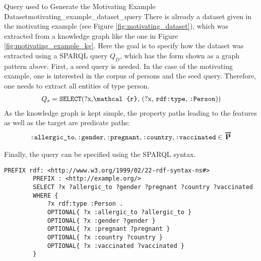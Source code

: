     \begin{Bsp}{Query used to Generate the Motivating Example Dataset}{motivating_example_dataset_query}
    There is already a dataset given in the motivating example (see Figure \ref{fig:motivating_dataset}), which was extracted from a knowledge graph like the one in Figure \ref{fig:motivating_example_kg}. Here the goal is to specify how the dataset was extracted using a SPARQL query $Q_D$, which has the form shown as a graph pattern above.
    First, a seed query is needed. In the case of the motivating example, one is interested in the corpus of persons and the seed query. Therefore, one needs to extract all entities of type person.
    \begin{gather*}
        Q_s = \text{\uri{SELECT}(?x,$\mathcal{r}$, (?x, \uri{rdf:type}, \uri{:Person}))}
    \end{gather*}
    As the knowledge graph is kept simple, the property paths leading to the features as well as the target are predicate paths:
    \begin{gather*}
        \text{\texttt{:allergic\_to}},\text{\texttt{:gender}}, \text{\texttt{:pregnant}}, \text{\texttt{:country}}, \text{\texttt{:vaccinated}} \in \overrightarrow{\mathbf{P}}
    \end{gather*}
    
    Finally, the query can be specified using the SPARQL syntax.
    
        \begin{lstlisting}[captionpos=b, caption=SPARQL query to generate the motivating example dataset, label=lst:generating_sparql_query_motivating_example, basicstyle=\ttfamily, frame=single]
        PREFIX rdf: <http://www.w3.org/1999/02/22-rdf-syntax-ns#>    
        PREFIX : <http://example.org/>
        SELECT ?x ?allergic_to ?gender ?pregnant ?country ?vaccinated 
        WHERE {
            ?x rdf:type :Person .
            OPTIONAL{ ?x :allergic_to ?allergic_to }
            OPTIONAL{ ?x :gender ?gender }
            OPTIONAL{ ?x :pregnant ?pregnant }
            OPTIONAL{ ?x :country ?country }
            OPTIONAL{ ?x :vaccinated ?vaccinated }
        }
        \end{lstlisting}
    \end{Bsp}
    
